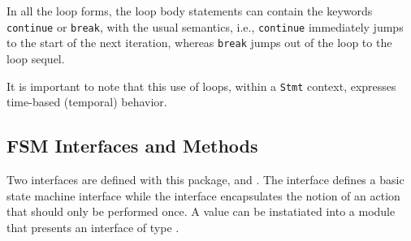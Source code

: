 In all the loop forms, the loop body statements can contain the
keywords \texttt{continue} or \texttt{break}, with the usual semantics,
i.e., \texttt{continue} immediately jumps to the start of the next
iteration, whereas \texttt{break} jumps out of the loop to the loop
sequel.

It is important to note that this use of loops, within a \texttt{Stmt}
context, expresses time-based (temporal) behavior. %








\subsection{FSM Interfaces and Methods}

Two interfaces are defined with this package,  and .
The  interface defines a basic state machine interface while the 
interface encapsulates the notion of an action that should only be
performed once.  A  value can be instatiated into a module
that presents an interface of type .

